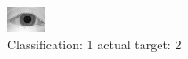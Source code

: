 \begin{figure}[h!]
\begin{center}
\includegraphics[width=0.60\columnwidth]{figures/ID994_class_1_target_2.png}
\end{center}
\caption{ Classification: 1 actual target: 2}
\label{fig:ID994_class_1_target_2}
\end{figure}

